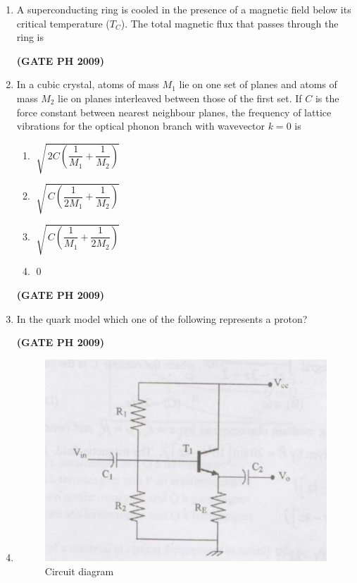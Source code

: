 \documentclass[14pt, a4paper]{extarticle}
\begin{document}
\begin{enumerate}[label=\textbf{Q. \arabic*}]
\item A superconducting ring is cooled in the presence of a magnetic field below its critical temperature ($T_C$). 
The total magnetic flux that passes through the ring is
\begin{enumerate}
\end{enumerate}
\hfill \textbf{(GATE PH 2009)}

\item In a cubic crystal, atoms of mass $M_1$ lie on one set of planes and atoms of mass $M_2$ lie on planes interleaved between those of the first set. If $C$ is the force constant between nearest neighbour planes, the frequency of lattice vibrations for the optical phonon branch with wavevector $k=0$ is
\begin{enumerate}
\item$\; \sqrt{\,2C \left(\dfrac{1}{M_1} + \dfrac{1}{M_2}\right)}$
\item$\; \sqrt{\,C \left(\dfrac{1}{2M_1} + \dfrac{1}{M_2}\right)}$
\item$\; \sqrt{\,C \left(\dfrac{1}{M_1} + \dfrac{1}{2M_2}\right)}$
\item$\; 0$
\end{enumerate}
\hfill \textbf{(GATE PH 2009)}

\item In the quark model which one of the following represents a proton?
    \begin{enumerate}
    \end{enumerate}
    \hfill \textbf{(GATE PH 2009)}

\item

\begin{figure}[H]
\centering
\includegraphics[width=0.6\columnwidth]{figs/Q19fig.png}
\caption{Circuit diagram}
\label{fig:q17}
\end{figure}


\end{enumerate}
\end{document}
